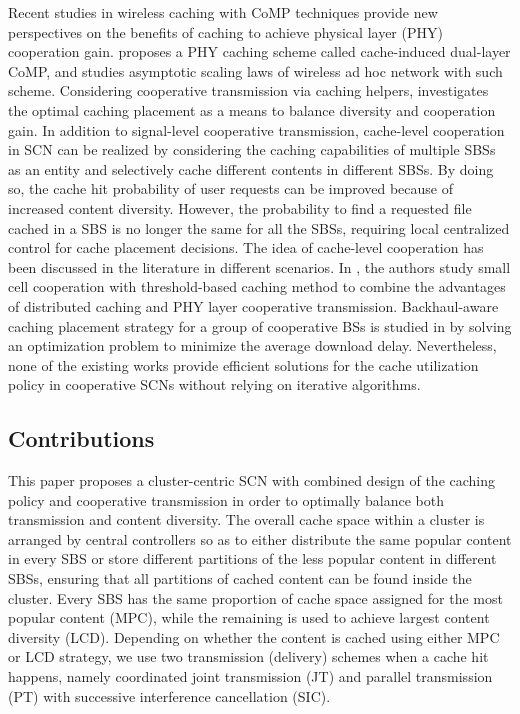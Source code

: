 \documentclass[twocolumns,10pt]{IEEEtran}
\begin{document}
Recent studies in wireless caching with CoMP techniques provide new perspectives on the benefits of caching to achieve physical layer (PHY) cooperation gain. \cite{liu2015asymptotic} proposes a PHY caching scheme called cache-induced dual-layer CoMP, and studies asymptotic scaling laws of wireless ad hoc network with such scheme.
Considering cooperative transmission via caching helpers, \cite{cooperative_transmission} investigates the optimal caching placement as a means to balance diversity and cooperation gain.   
In addition to signal-level cooperative transmission, cache-level cooperation in SCN can be realized by considering the caching capabilities of multiple SBSs as an entity and selectively cache different contents in different SBSs. By doing so, the cache hit probability of user requests can be improved because of increased content diversity. However, the probability to find a requested file cached in a SBS is no longer the same for all the SBSs, requiring local centralized control for cache placement decisions. The idea of cache-level cooperation has been discussed in the literature in different scenarios. In \cite{small_cell_coop}, the authors study small cell cooperation with threshold-based caching method to combine the advantages of distributed caching and PHY layer cooperative transmission. Backhaul-aware caching placement strategy for a group of cooperative BSs is studied in \cite{backhaul_aware} by solving an optimization problem to minimize the average download delay. 
Nevertheless, none of the existing works provide efficient solutions for the cache utilization policy in cooperative SCNs without relying on iterative algorithms. 


\subsection{Contributions}
This paper proposes a cluster-centric SCN with combined design of the caching policy and cooperative transmission in order to optimally balance both transmission and content diversity. The overall cache space within a cluster is arranged by central controllers so as to either distribute the same popular content in every SBS or store different partitions of the less popular content in different SBSs, ensuring that all partitions of cached content can be found inside the cluster. Every SBS has the same proportion of cache space assigned for the most popular content (MPC), while the remaining is used to achieve largest content diversity (LCD). Depending on whether the content is cached using either MPC or LCD strategy, we use two transmission (delivery) schemes when a cache hit happens, namely coordinated joint transmission (JT) and parallel transmission (PT) with successive interference cancellation (SIC). 
\end{document}
